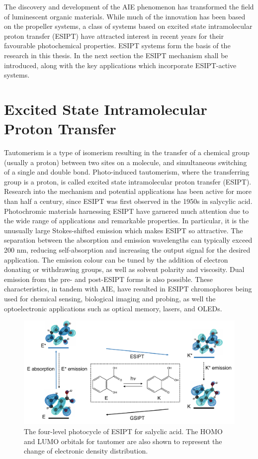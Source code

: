 The discovery and development of the AIE phenomenon has transformed the field of luminescent organic materials. While much of the innovation has been based on the propeller systems, a class of systems based on excited state intramolecular proton transfer (ESIPT) have attracted interest in recent years for their favourable photochemical properties. ESIPT systems form the basis of the research in this thesis. In the next section the ESIPT mechanism shall be introduced, along with the key applications which incorporate ESIPT-active systems.
\section{Excited State Intramolecular Proton Transfer}\label{section: lom ESIPT}
Tautomerism is a type of isomerism resulting in the transfer of a chemical group (usually a proton) between two sites on a molecule, and simultaneous switching of a single and double bond. Photo-induced tautomerism, where the transferring group is a proton, is called excited state intramolecular proton transfer (ESIPT). Research into the mechanism and potential applications has been active for more than half a century, since ESIPT was first observed in the 1950s in salycylic acid. Photochromic materials harnessing ESIPT have garnered much attention due to the wide range of applications and remarkable properties. In particular, it is the unusually large Stokes-shifted emission which makes ESIPT so attractive. The separation between the absorption and emission wavelengths can typically exceed 200 nm, reducing self-absorption and increasing the output signal for the desired application. The emission colour can be tuned by the addition of electron donating or withdrawing groups, as well as solvent polarity and viscosity.\cite{Azarias2016,Yushchenko2007} Dual emission from the pre- and post-ESIPT forms is also possible. These characteristics, in tandem with AIE, have resulted in ESIPT chromophores being used for chemical sensing, biological imaging and probing, as well the optoelectronic applications such as optical memory, lasers, and OLEDs.\cite{Hsieh2010,Kwon2011,Zhao2012,Demchenko2013,Padalkar2015,Chen2018}
\begin{figure}[H]
\centering
  \includegraphics[width=0.95\linewidth]{Intro/ESIPT.pdf}
  \caption[The four-level photocycle of ESIPT]{The four-level photocycle of ESIPT for salyclic acid. The HOMO and LUMO orbitals for tautomer are also shown to represent the change of electronic density distribution.}
  \label{figure: ESIPT}
\end{figure}
